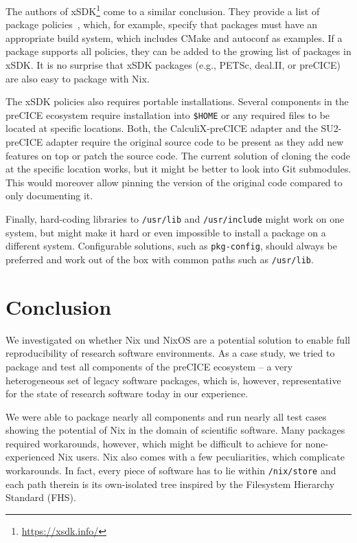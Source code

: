 \documentclass{eceasst}
\begin{document}
The authors of xSDK\footnote{\url{https://xsdk.info/}} come to a similar conclusion.
They provide a list of package policies~\cite{xSDK2023}, which, for example, specify that packages must have an appropriate build system, which includes CMake and autoconf as examples.
If a package supports all policies, they can be added to the growing list of packages in xSDK.
It is no surprise that xSDK packages (e.g., PETSc, deal.II, or preCICE) are also easy to package with Nix.

The xSDK policies also requires portable installations. Several components in the preCICE ecosystem require installation into \texttt{\$HOME} or any required files to be located at specific locations. Both, the CalculiX-preCICE adapter and the SU2-preCICE adapter require the original source code to be present as they add new features on top or patch the source code.
The current solution of cloning the code at the specific location works, but it might be better to look into Git submodules. This would moreover allow pinning the version of the original code compared to only documenting it.

Finally, hard-coding libraries to \texttt{/usr/lib} and \texttt{/usr/include} might work on one system, but might make it hard or even impossible to install a package on a different system.
Configurable solutions, such as \texttt{pkg-config}, should always be preferred and work out of the box with common paths such as \texttt{/usr/lib}.

\section{Conclusion}

We investigated on whether Nix und NixOS are a potential solution to enable full reproducibility of research software environments. As a case study, we tried to package and test all components of the preCICE ecosystem -- a very heterogeneous set of legacy software packages, which is, however, representative for the state of research software today in our experience.

We were able to package nearly all components and run nearly all test cases showing the potential of Nix in the domain of scientific software. Many packages required workarounds, however, which might be difficult to achieve for none-experienced Nix users.
Nix also comes with a few peculiarities, which complicate workarounds.
In fact, every piece of software has to lie within \texttt{/nix/store} and each path therein is its own-isolated tree inspired by the Filesystem Hierarchy Standard (FHS).
\end{document}
